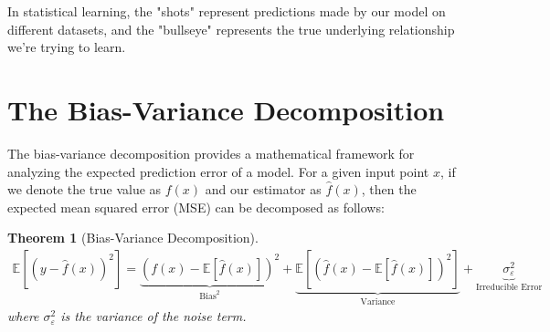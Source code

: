 \documentclass{article}
\newtheorem{theorem}{Theorem}
\begin{document}
In statistical learning, the "shots" represent predictions made by our model on different datasets, and the "bullseye" represents the true underlying relationship we're trying to learn.

\section{The Bias-Variance Decomposition}

The bias-variance decomposition provides a mathematical framework for analyzing the expected prediction error of a model. For a given input point $x$, if we denote the true value as $f(x)$ and our estimator as $\hat{f}(x)$, then the expected mean squared error (MSE) can be decomposed as follows:

\begin{theorem}[Bias-Variance Decomposition]
\begin{align*}
\mathbb{E}[(y - \hat{f}(x))^2] = \underbrace{(f(x) - \mathbb{E}[\hat{f}(x)])^2}_{\text{Bias}^2} + \underbrace{\mathbb{E}[(\hat{f}(x) - \mathbb{E}[\hat{f}(x)])^2]}_{\text{Variance}} + \underbrace{\sigma^2_\varepsilon}_{\text{Irreducible Error}}
\end{align*}
where $\sigma^2_\varepsilon$ is the variance of the noise term.
\end{theorem}
\end{document}
